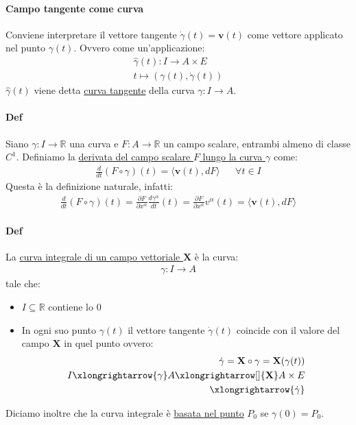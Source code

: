 \paragraph{Campo tangente come curva} Conviene interpretare il vettore tangente $\dot{\gamma}(t)=\mathbf{v}(t)$ come vettore applicato nel punto $\gamma(t)$. Ovvero come un'applicazione:
\begin{align*}
    \hat{\gamma}(t)\colon I \to A\times E\\
    t\mapsto (\gamma(t),\dot{\gamma}(t))
\end{align*}
$\hat{\gamma}(t)$ viene detta \underline{curva tangente} della curva $\gamma\colon I \to A$.
\paragraph{Def} Siano $\gamma \colon I \to \mathbb{R}$ una curva e $F\colon A \to \mathbb{R}$ un campo scalare, entrambi almeno di classe $C^1$.
Definiamo la \underline{derivata del campo scalare $F$ lungo la curva $\gamma$} come:
\begin{align*}
    \frac{d}{dt}(F\circ \gamma)(t)=\langle \mathbf{v}(t),dF\rangle && \forall t \in I
\end{align*}
Questa è la definizione naturale, infatti:
\begin{align*}
    \frac{d}{dt}(F\circ \gamma)(t)=\frac{\partial F}{\partial x^\alpha}\frac{d\gamma^\alpha}{dt}(t)=\frac{\partial F}{\partial x^\alpha}v^\alpha(t)=\langle\mathbf{v}(t),dF\rangle
\end{align*}
\paragraph{Def} La \underline{curva integrale di un campo vettoriale $\mathbf{X}$} è la curva:
\begin{align*}
    \gamma \colon I \to A
\end{align*}
tale che:
\begin{itemize}
    \item $I\subseteq \mathbb{R}$ contiene lo $0$
    \item In ogni suo punto $\gamma(t)$ il vettore tangente $\dot{\gamma}(t)$ coincide con il valore del campo $\mathbf{X}$ in quel punto ovvero:
    \begin{align*}
        \dot{\gamma}=\mathbf{X}\circ \gamma=\mathbf{X}(\gamma(t))\\
        I\xlongrightarrow{\gamma}A\xlongrightarrow[]{\mathbf{X}}A\times E\\
        \xlongrightarrow{\dot{\gamma}}
    \end{align*}
\end{itemize}
Diciamo inoltre che la curva integrale è \underline{basata nel punto} $P_0$ se $\gamma(0)=P_0$.
